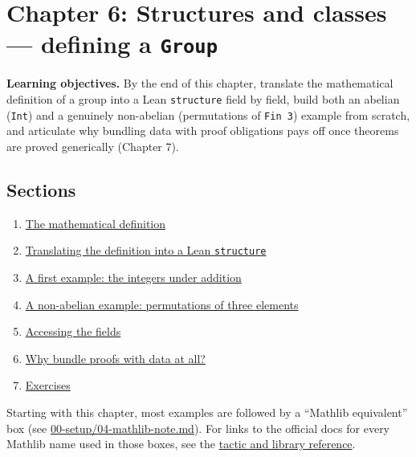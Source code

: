 \chapter{\texorpdfstring{Chapter 6: Structures and classes --- defining a \texttt{Group}}{Chapter 6: Structures and classes --- defining a Group}}\label{sec:06-groups:00-index:1}

\textbf{Learning objectives.} By the end of this chapter, translate the mathematical definition of a group into a Lean \texttt{structure} field by field, build both an abelian (\texttt{Int}) and a genuinely non-abelian (permutations of \texttt{Fin 3}) example from scratch, and articulate why bundling data with proof obligations pays off once theorems are proved generically (Chapter 7).

\section{Sections}\label{sec:06-groups:00-index:2}

\begin{enumerate}
\def\labelenumi{\arabic{enumi}.}
\tightlist
\item
  \hyperref[sec:06-groups:01-definition:1]{The mathematical definition}
\item
  \hyperref[sec:06-groups:02-translating:1]{Translating the definition into a Lean \texttt{structure}}
\item
  \hyperref[sec:06-groups:03-integers-example:1]{A first example: the integers under addition}
\item
  \hyperref[sec:06-groups:04-permutations-example:1]{A non-abelian example: permutations of three elements}
\item
  \hyperref[sec:06-groups:05-accessing-fields:1]{Accessing the fields}
\item
  \hyperref[sec:06-groups:06-why-bundle:1]{Why bundle proofs with data at all?}
\item
  \hyperref[sec:06-groups:07-exercises:1]{Exercises}
\end{enumerate}

Starting with this chapter, most examples are followed by a ``Mathlib equivalent'' box (see \hyperref[sec:00-setup:04-mathlib-note:1]{00-setup/04-mathlib-note.md}). For links to the official docs for every Mathlib name used in those boxes, see the \hyperref[sec:root:tactic-and-library-reference:1]{tactic and library reference}.








